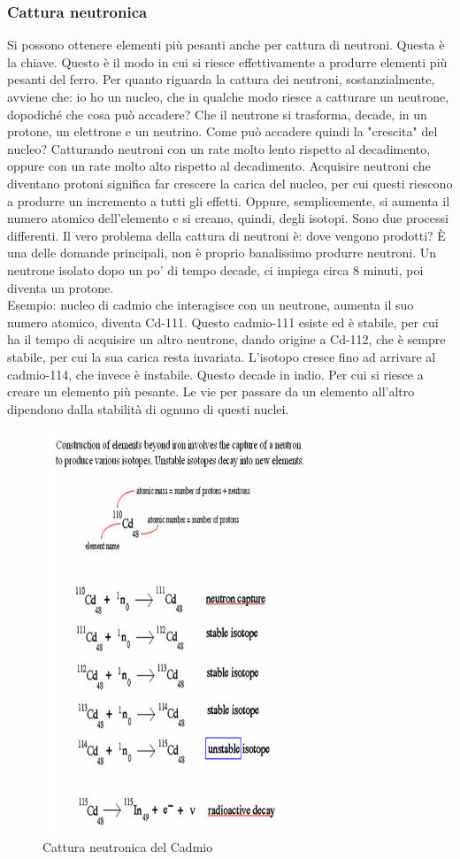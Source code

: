 \documentclass[a4paper,11pt]{article}
\begin{document}
    \subsubsection{Cattura neutronica}
    Si possono ottenere elementi più pesanti anche per cattura di neutroni. Questa è la chiave. Questo è il modo in cui si riesce effettivamente a produrre elementi più pesanti del ferro. Per quanto riguarda la cattura dei neutroni, sostanzialmente, avviene che: io ho un nucleo, che in qualche modo riesce a catturare un neutrone, dopodiché che cosa può accadere? Che il neutrone si trasforma, decade, in un protone, un elettrone e un neutrino. Come può accadere quindi la "crescita" del nucleo? Catturando neutroni con un rate molto lento rispetto al decadimento, oppure con un rate molto alto rispetto al decadimento. Acquisire neutroni che diventano protoni significa far crescere la carica del nucleo, per cui questi riescono a produrre un incremento a tutti gli effetti. Oppure, semplicemente, si aumenta il numero atomico dell'elemento e si creano, quindi, degli isotopi. Sono due processi differenti. Il vero problema della cattura di neutroni è: dove vengono prodotti? \`E una delle domande principali, non è proprio banalissimo produrre neutroni. Un neutrone isolato dopo un po' di tempo decade, ci impiega circa 8 minuti, poi diventa un protone. \\ Esempio: nucleo di cadmio che interagisce con un neutrone,  aumenta il suo  numero atomico, diventa Cd-111. Questo cadmio-111 esiste ed è stabile, per cui ha il tempo di acquisire un altro neutrone, dando origine a Cd-112, che è sempre stabile, per cui la sua carica resta invariata. L'isotopo cresce fino ad arrivare al cadmio-114, che invece è instabile. Questo decade in indio. Per cui si riesce a creare un elemento più pesante. Le vie per passare da un elemento all'altro dipendono dalla stabilità di ognuno di questi nuclei.
    \begin{figure}[h!!]
        \centering
        \includegraphics[width=8cm]{lezione 28 novembre/cadmio.png}
        \caption{Cattura neutronica del Cadmio}
        \label{lezione 28 novembre/cadmio.png}
    \end{figure} \\
\end{document}

